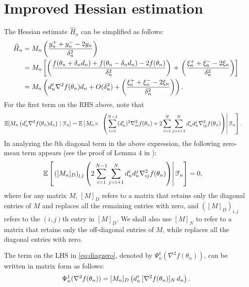 \section{Improved Hessian estimation}
The Hessian estimate $\widehat H_n$ can be simplified as follows: 
\begin{align}
\widehat H_n & = M_n \left(\dfrac{y_n^+ + y_n^- - 2 y_n}{\delta_n^2}\right) \nonumber \\
& =  M_n \left[\left(\dfrac{f(\theta_n+\delta_n d_n) + f(\theta_n-\delta_n d_n) - 2 f(\theta_n)}{\delta_n^2}\right) \right. +\left. \left(\dfrac{\xi_n^+ + \xi_n^- - 2 \xi_n}{\delta_n^2}\right)\right] \nonumber \\
& = M_n \left(d_n^\mathsf{\scriptscriptstyle T} \nabla^2 f(\theta_n) d_n +  O(\delta_n^2) + \left(\dfrac{\xi_n^+ + \xi_n^- - 2 \xi_n}{\delta_n^2} \right)\right).\label{eq:h0}
\end{align}
For the first term on the RHS above, note that 
\begin{align}
&\mathbb{E}[M_n \left(d_n^\mathsf{\scriptscriptstyle T} \nabla^2 f(\theta_n) d_n\right) \mid \mathcal{F}_n] =   \mathbb{E}\left[\left. M_n \times\right.\right.\left.\left.\left(\sum\limits_{i=1}^{N-1} (d_n^i)^2 \nabla^2_{ii} f(\theta_n) + 2\sum\limits_{i=1}^N\sum\limits_{j=i+1}^N d_n^i d_n^j \nabla^2_{ij} f(\theta_n) \right)\right| \mathcal{F}_n\right]. \label{eq:h1-ch2}
\end{align}
In analyzing the $l$th diagonal term in the above expression, the following zero-mean term appears (see the proof of Lemma 4 in \cite{prashanth2015rdsa}):
\begin{align}
& \mathbb{E}\left[\left. \left([M_n]_{D}\right)_{l,l} \left(2\sum\limits_{i=1}^{N-1}\sum\limits_{j=i+1}^N d_n^i d_n^j \nabla^2_{ij} f(\theta_n)\right)\right| \mathcal{F}_{n}\right] = 0,\label{eq:diagzero}
\end{align}
where for any matrix $M$, $[M]_{D}$ refers to a matrix that retains only the diagonal entries of $M$ and replaces all the remaining  entries with zero, and $\left([M]_{D}\right)_{i,j}$ refers to the $(i,j)$th entry in $[M]_D$. We shall also use $[M]_{N}$ to refer to a matrix that retains only the off-diagonal entries of $M$, while replaces all the diagonal entries with zero.

The term on the LHS in \eqref{eq:diagzero}, denoted by $\Psi_{n}^{1}(\nabla^2 f(\theta_n))$, can be written in matrix form as follows: 
\begin{align}\label{eq:digmat}
\Psi_{n}^{1}(\nabla^2 f(\theta_n)) = [M_n]_{D}\left(d_{n}^\mathsf{\scriptscriptstyle T} \, [\nabla^2 f(\theta_n)]_{N} \, d_{n}\right).
\end{align}

